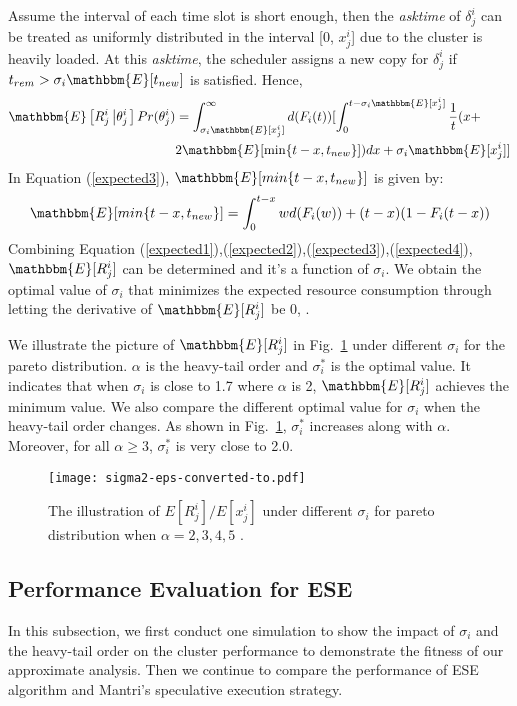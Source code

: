 \documentclass[10pt,conference]{IEEEtran}
\begin{document}
Assume the interval of each time slot is short enough, then the \textit{asktime} of $\delta^i_j$ can be treated as uniformly distributed in the interval [0, $x^i_j$] due to the cluster is heavily loaded. At this \textit{asktime}, the scheduler assigns a new copy for $\delta^i_j$ if $t_{rem} > \sigma_i \mathbbm{E} [t_{new}]$ is satisfied. Hence,
\begin{equation}
\begin{split}
\mathbbm{E} \left[ R^i_j \left|
 {\theta^i_j} \right. \right] Pr ( {\theta^i_j} ) &= \int_{\sigma_i \mathbbm{E}[x^i_j]}^{\infty}d(F_i(t))[\int_{0}^{t-\sigma_i\mathbbm{E}[x^i_j]}\frac{1}{t}(x+\\ & 2\mathbbm{E}[\min\{t-x,t_{new}\}])dx + \sigma_i\mathbbm{E}[x^i_j]]
 \end{split}
  \label{expected3}
\end{equation}
In Equation (\ref{expected3}), $\mathbbm{E}[min\{t-x,t_{new}\}]$ is given by:
\begin{equation}
\mathbbm{E}[min\{t-x,t_{new}\}] = \int_{0}^{t-x}wd(F_i(w)) + (t-x)(1-F_i(t-x))
 \label{expected4}
\end{equation}
Combining Equation (\ref{expected1}),(\ref{expected2}),(\ref{expected3}),(\ref{expected4}), $\mathbbm{E}[R^i_j]$ can be determined and it's a function of $\sigma_i$. We obtain the optimal value of $\sigma_i$ that minimizes the expected resource consumption through letting the derivative of $\mathbbm{E}[R^i_j]$ be 0, .

We illustrate the picture of $\mathbbm{E}[R^i_j]$  in Fig.~\ref{sigma2} under different $\sigma_i$ for the pareto distribution.  $\alpha$ is the heavy-tail order and $\sigma_i^*$ is the optimal value. It indicates that when $\sigma_i$ is close to 1.7 where $\alpha$ is 2, $\mathbbm{E}[R^i_j]$ achieves the minimum value. We also compare the different optimal value for $\sigma_i$ when the heavy-tail order changes. As shown in Fig.~\ref{sigma2},  $\sigma_i^*$ increases along with $\alpha$. Moreover, for all $\alpha \geq 3$, $\sigma_i^*$ is very close to 2.0.

\begin{figure}
\centering
\texttt{[image: sigma2-eps-converted-to.pdf]}
\caption{The illustration of ${E}[R^i_j]/{E}[x^i_j]$ under different $\sigma_i$ for pareto distribution when $\alpha = 2, 3, 4, 5$ .}
\label{sigma2}
\vspace{-0.3 cm}
\end{figure}

\subsection{Performance Evaluation for ESE}
In this subsection, we first conduct one  simulation to  show the impact of $\sigma_i$ and the heavy-tail order on the cluster performance  to demonstrate the fitness of our approximate analysis. Then  we continue to compare the performance of ESE algorithm and Mantri's speculative execution strategy.
\end{document}
